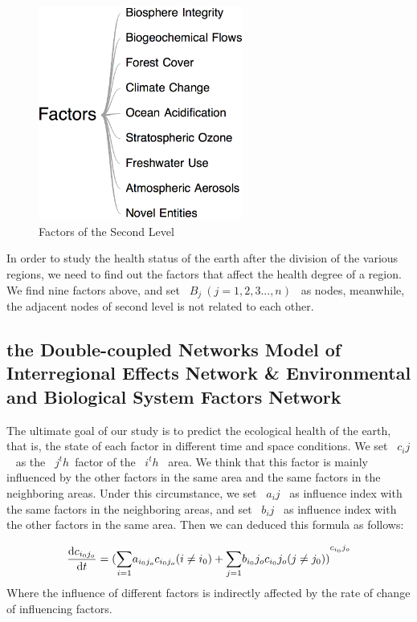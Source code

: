 \documentclass[a4paper,11pt]{article}
\begin{document}
\begin{figure}[h]%
    \centering %
    \includegraphics[width=0.6\textwidth]{./Pic/Factors.png}
    \caption{Factors of the Second Level} 
    \label{fig:Factors}  
    \end{figure}


\par In order to study the health status of the earth after the division of the various regions, we need to find out the factors that affect the health degree of a region. We find nine factors above, and set ~$B_j~(j=1,2,3...,n)$~ as nodes, meanwhile, the adjacent nodes of second level is not related to each other.

\subsection{the Double-coupled Networks Model of Interregional Effects Network \& Environmental and Biological System Factors Network}
\par The ultimate goal of our study is to predict the ecological health of the earth, that is, the state of each factor in different time and space conditions. We set ~$c_ij$~ as the ~$j^th$~factor of the ~$i^th$~ area. We think that this factor is mainly influenced by the other factors in the same area and the same factors in the neighboring areas. Under this circumstance, we set ~$a_ij$~ as influence index with the same factors in the neighboring areas, and set ~$b_ij$~ as influence index with the other factors in the same area. Then we can deduced this formula as follows:

\begin{equation}
 \frac{  {\rm d}  c_{{i_0}{j_o}} } {{\rm d} t}={({\sum_{i=1}^{}}{a_{i_{0}j_{o}}{c_{i_{0}j_{o}}(i\neq i_0)}+{\sum_{j=1}^{}} {b_{i_0}{j_o}}{c_{i_0}{j_o}}(j\neq j_0)})}^{c_{i_0}{j_o}}
 \end{equation}
Where the influence of different factors is indirectly affected by the rate of change of influencing factors.
\end{document}
